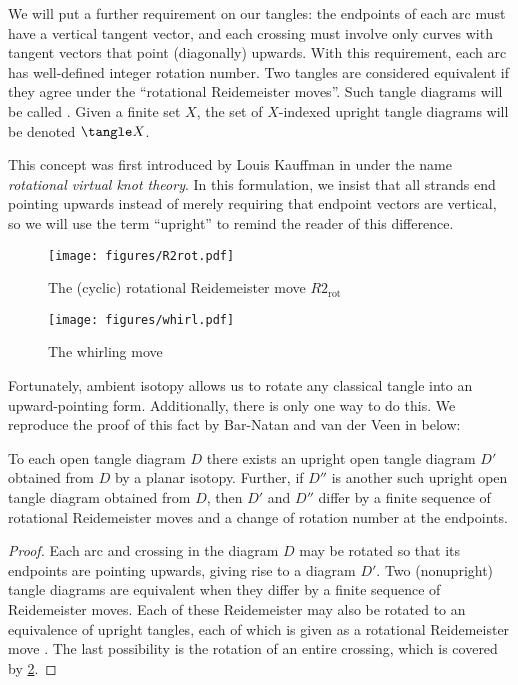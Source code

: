\begin{definition}
        We will put a further requirement on our tangles: the endpoints of each
        arc must have a vertical tangent vector, and each crossing must involve
        only curves with tangent vectors that point (diagonally) upwards. With
        this requirement, each arc has well-defined integer rotation number. Two
        tangles are considered equivalent if they agree under the
        \enquote{rotational Reidemeister moves}. Such tangle diagrams will be
        called . Given a finite set $X$, the set
        of $X$-indexed upright tangle diagrams will be denoted $\tangle X$.
\end{definition}
\begin{remark}
        This concept was first introduced by Louis Kauffman in \cite{LK} under
        the name \emph{rotational virtual knot theory}. In this formulation, we
        insist that all strands end pointing upwards instead of merely requiring
        that endpoint vectors are vertical, so we will use the term
        \enquote{upright} to remind the reader of this difference.
\end{remark}
\begin{figure}[h]
        \centering
        \texttt{[image: figures/R2rot.pdf]}
        \caption{The (cyclic) rotational Reidemeister move $R2_{\text{rot}}$}
        \label{fig:R2rot}
\end{figure}
\begin{figure}[h]
        \centering
        \texttt{[image: figures/whirl.pdf]}
        \caption{The whirling move}
        \label{fig:whirl}
\end{figure}

Fortunately, ambient isotopy allows us to rotate any classical tangle into an
upward-pointing form. Additionally, there is only one way to do this. We
reproduce the proof of this fact by Bar-Natan and van der Veen in \cite{BV}
below:

\begin{lemma}
        To each open tangle diagram $D$ there exists an upright open tangle
        diagram $D'$ obtained from $D$ by a planar isotopy. Further, if $D''$ is
        another such upright open tangle diagram obtained from $D$, then $D'$
        and $D''$ differ by a finite sequence of rotational Reidemeister moves
        and a change of rotation number at the endpoints.
\end{lemma}
\begin{proof}
        Each arc and crossing in the diagram $D$ may be rotated so that its
        endpoints are pointing upwards, giving rise to a diagram $D'$. Two
        (nonupright) tangle diagrams are equivalent when they differ by a finite
        sequence of Reidemeister moves. Each of these Reidemeister may also be
        rotated to an equivalence of upright tangles, each of which is given as
        a rotational Reidemeister move . The
        last possibility is the rotation of an entire crossing, which is covered
        by \cref{fig:whirl}.
\end{proof}


